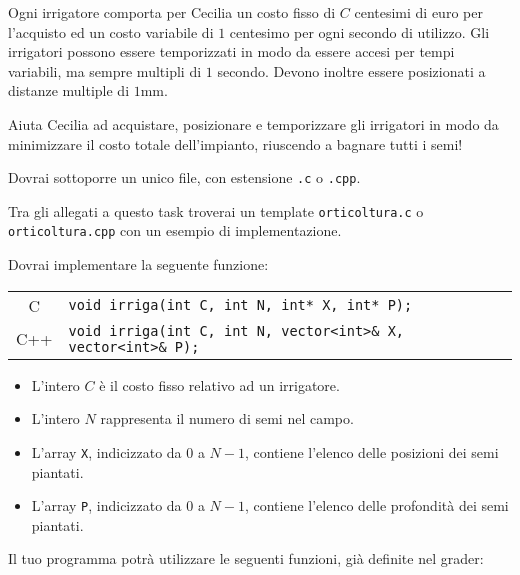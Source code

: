 Ogni irrigatore comporta per Cecilia un costo fisso di $C$ centesimi di euro per
l'acquisto ed un costo variabile di $1$ centesimo per ogni secondo di utilizzo.
Gli irrigatori possono essere temporizzati in modo da essere accesi per tempi
variabili, ma sempre multipli di $1$ secondo. Devono inoltre essere posizionati
a distanze multiple di $1$mm.

Aiuta Cecilia ad acquistare, posizionare e temporizzare gli irrigatori in modo
da minimizzare il costo totale dell'impianto, riuscendo a bagnare tutti i semi!



\Implementation

Dovrai sottoporre un unico file, con estensione \texttt{.c} o \texttt{.cpp}.

\begin{warning}
Tra gli allegati a questo task troverai un template \texttt{orticoltura.c} o
\texttt{orticoltura.cpp} con un esempio di implementazione.
\end{warning}

Dovrai implementare la seguente funzione:

\begin{center}\begin{tabularx}{\textwidth}{|c|X|}
\hline
C    & \verb|void irriga(int C, int N, int* X, int* P);|\\
C++  & \verb|void irriga(int C, int N, vector<int>& X, vector<int>& P);|\\
\hline
\end{tabularx}\end{center}

\begin{itemize}[nolistsep]
  \item L'intero $C$ è il costo fisso relativo ad un irrigatore.
  \item L'intero $N$ rappresenta il numero di semi nel campo.
  \item L'array \texttt{X}, indicizzato da $0$ a $N-1$, contiene l'elenco delle posizioni dei semi piantati.
  \item L'array \texttt{P}, indicizzato da $0$ a $N-1$, contiene l'elenco delle profondità dei semi piantati.
\end{itemize}

\medskip

Il tuo programma potrà utilizzare le seguenti funzioni, già definite nel grader:

